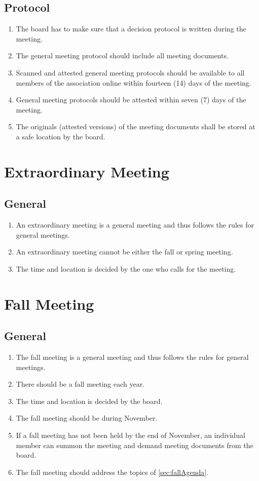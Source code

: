 \subsection{Protocol}
\begin{enumerate}
  \item The board has to make sure that a decision protocol is written during the meeting.
  \item The general meeting protocol should include all meeting documents.
  \item Scanned and attested general meeting protocols should be available to all members of the association online within fourteen (14) days of the meeting.
  \item General meeting protocols should be attested within seven (7) days of the meeting.
  \item The originals (attested versions) of the meeting documents shall be stored at a safe location by the board. 
\end{enumerate}

\section*{Extraordinary Meeting}
\subsection{General}
\begin{enumerate}
  \item An extraordinary meeting is a general meeting and thus follows the rules for general meetings.
  \item An extraordinary meeting cannot be either the fall or spring meeting.
  \item The time and location is decided by the one who calls for the meeting.
\end{enumerate}

\section*{Fall Meeting}
\subsection{General}
\begin{enumerate}
  \item The fall meeting is a general meeting and thus follows the rules for general meetings.
  \item There should be a fall meeting each year.
  \item The time and location is decided by the board.
  \item The fall meeting should be during November.
  \item If a fall meeting has not been held by the end of November, an individual member can summon the meeting and demand meeting documents from the board.
  \item The fall meeting should address the topics of \ref{sec:fallAgenda}.
\end{enumerate}

